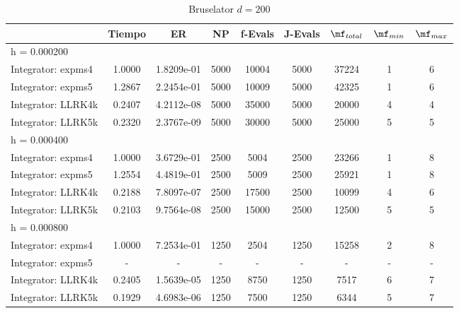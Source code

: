\begin{table}[htb]
	\centering
\begin{tabular}{l|c|c|c|c|c|c|c|c}
\hline
& Tiempo & ER & NP & f-Evals & J-Evals & $\mf_{total}$ & $\mf_{min}$ & $\mf_{max}$ \\
\hline h = 0.000200 &  &  &  &  &  &  &  &  \\
 Integrator: expms4 & 1.0000 & 1.8209e-01 & 5000 & 10004 & 5000 & 37224 & 1 & 6  \\
Integrator: expms5 & 1.2867 & 2.2454e-01 & 5000 & 10009 & 5000 & 42325 & 1 & 6  \\
Integrator: LLRK4k & 0.2407 & 4.2112e-08 & 5000 & 35000 & 5000 & 20000 & 4 & 4  \\
Integrator: LLRK5k & 0.2320 & 2.3767e-09 & 5000 & 30000 & 5000 & 25000 & 5 & 5  \\
\hline
\hline h = 0.000400 &  &  &  &  &  &  &  &  \\
 Integrator: expms4 & 1.0000 & 3.6729e-01 & 2500 & 5004 & 2500 & 23266 & 1 & 8  \\
Integrator: expms5 & 1.2554 & 4.4819e-01 & 2500 & 5009 & 2500 & 25921 & 1 & 8  \\
Integrator: LLRK4k & 0.2188 & 7.8097e-07 & 2500 & 17500 & 2500 & 10099 & 4 & 6  \\
Integrator: LLRK5k & 0.2103 & 9.7564e-08 & 2500 & 15000 & 2500 & 12500 & 5 & 5  \\
\hline
\hline h = 0.000800 &  &  &  &  &  &  &  &  \\
 Integrator: expms4 & 1.0000 & 7.2534e-01 & 1250 & 2504 & 1250 & 15258 & 2 & 8  \\
Integrator: expms5 & - & - & - & - & - & - & - & -  \\
Integrator: LLRK4k & 0.2405 & 1.5639e-05 & 1250 & 8750 & 1250 & 7517 & 6 & 7  \\
Integrator: LLRK5k & 0.1929 & 4.6983e-06 & 1250 & 7500 & 1250 & 6344 & 5 & 7  \\
\hline
\end{tabular}
\caption{Bruselator $d=200$}
\end{table}
